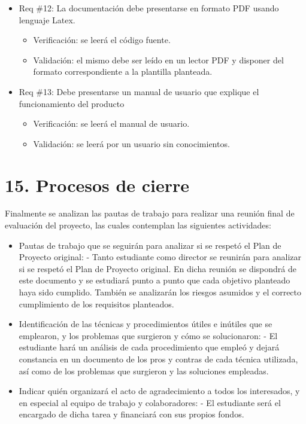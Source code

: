 \documentclass[
11pt, %
]{charter}
\begin{document}
\begin{itemize}
\item Req \#12: La documentación debe presentarse en formato PDF usando lenguaje Latex.
\begin{itemize}
	\item Verificación: se leerá el código fuente.
	\item Validación: el mismo debe ser leído en un lector PDF y disponer del formato correspondiente a la plantilla planteada.
\end{itemize}

\item Req \#13: Debe presentarse un manual de usuario que explique el funcionamiento del producto
\begin{itemize}
	\item Verificación: se leerá el manual de usuario.
	\item Validación: se leerá por un usuario sin conocimientos.
\end{itemize}
\end{itemize}


\section{15. Procesos de cierre}    
\label{sec:cierre}

Finalmente se analizan las pautas de trabajo para realizar una reunión final de evaluación del proyecto, las cuales contemplan las siguientes actividades:

\begin{itemize}
	\item Pautas de trabajo que se seguirán para analizar si se respetó el Plan de Proyecto original:
	 - Tanto estudiante como director se reunirán para analizar si se respetó el Plan de Proyecto original. En dicha reunión se dispondrá de este documento y se estudiará punto a punto que cada objetivo planteado haya sido cumplido. También se analizarán los riesgos asumidos y el correcto cumplimiento de los requisitos planteados.
	 
	\item Identificación de las técnicas y procedimientos útiles e inútiles que se emplearon, y los problemas que surgieron y cómo se solucionaron:
	 - El estudiante hará un análisis de cada procedimiento que empleó y dejará constancia en un documento de los pros y contras de cada técnica utilizada, así como de los problemas que surgieron y las soluciones empleadas.
	 
	\item Indicar quién organizará el acto de agradecimiento a todos los interesados, y en especial al equipo de trabajo y colaboradores:
	  - El estudiante será el encargado de dicha tarea y financiará con sus propios fondos.
\end{itemize}
\end{document}
